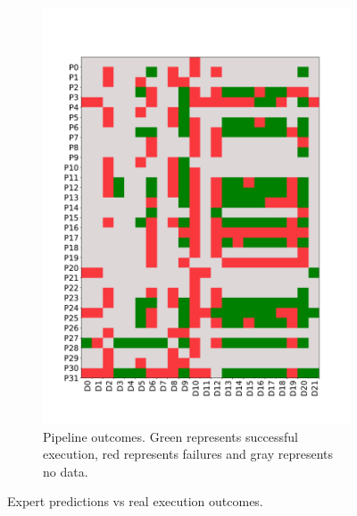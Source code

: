 \documentclass[conference]{IEEEtran}
\begin{document}
\begin{figure}
\begin{subfigure}{.45\textwidth}
  \includegraphics[width=\columnwidth]{figures/Pipeline Execution Level 2.pdf}
  \caption{Pipeline outcomes. Green represents successful execution, red represents failures and gray represents no data.}
  \label{fig:execution_matrix}
\end{subfigure}
\caption{Expert predictions vs real execution outcomes.}
\end{figure}
\end{document}
